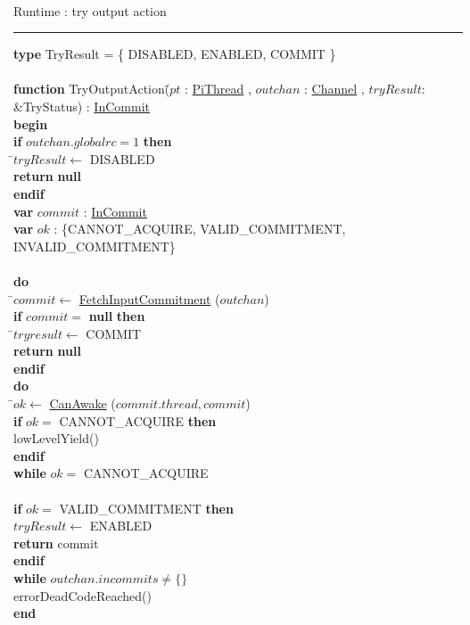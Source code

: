 \documentclass[a4paper,11pt]{article}
\newenvironment{program}{
  \begin{sffamily}
  \begin{scriptsize}
  \begin{tabbing}}
 {\end{tabbing}
  \end{scriptsize}
  \end{sffamily}}
\newcommand{\kw}[1]{\textsf{\textbf{#1}}}
\newcommand{\pindent}{\hspace{2em}\=}
\newcommand{\synchro}[1]{\textcolor{synchrocolor}{#1}}
\newcommand{\algotitle}[1]{\noindent\\ \noindent#1\par\nobreak\vspace{3pt}\hrule\vspace{6pt}}
\newcommand{\algosection}[1]{
  \phantomsection
  \algotitle{#1}
}
\newcommand{\myref}[1]{
  \hyperref[#1]{#1}
}
\begin{document}
\algosection{Runtime : try output action}
\begin{program}
  \kw{type} TryResult = \{ DISABLED, ENABLED, COMMIT \} \\
\\
  \kw{function} TryOutputAction(\=$pt$ : \myref{PiThread}, $outchan$ : \myref{Channel}, $tryResult$: \&TryStatus) : \myref{InCommit} \\
  \kw{begin} \\
  \pindent\kw{if} $outchan.globalrc = 1$ \kw{then} \\
  \>\pindent$tryResult \leftarrow$ DISABLED \\
  \>\>\kw{return} \kw{null} \\
  \>\kw{endif} \\
  \>\kw{var} $commit$ : \myref{InCommit} \\
  \>\kw{var} $ok$ : \{CANNOT\_ACQUIRE, VALID\_COMMITMENT, INVALID\_COMMITMENT\} \\
  \>\\
  \>\kw{do} \\
  \>\pindent$commit \leftarrow$ \myref{FetchInputCommitment}($outchan$) \\
  \>\>\kw{if} $commit =$ \kw{null} \kw{then} \\
  \>\>\pindent$tryresult \leftarrow$ COMMIT \\
  \>\>\>\kw{return} \kw{null} \\
  \>\>\kw{endif} \\

  \>\>\kw{do} \\
  \>\>\pindent$ok \leftarrow$ \myref{CanAwake}($commit.thread, commit$) \\
  \>\>\>\kw{if} $ok =$ CANNOT\_ACQUIRE \kw{then} \\
  \>\>\>\pindent\synchro{lowLevelYield()} \\
  \>\>\>\kw{endif} \\
  \>\>\kw{while} $ok =$ CANNOT\_ACQUIRE \\
  \>\>\\
  \>\>\kw{if} $ok =$ VALID\_COMMITMENT \kw{then} \\
  \>\>\> $tryResult \leftarrow$ ENABLED \\
  \>\>\> \kw{return} commit \\
  \>\>\kw{endif} \\
  \>\kw{while} $outchan.incommits \neq \{\}$ \\
  \> errorDeadCodeReached() \\
  \kw{end}
\end{program}
\end{document}
